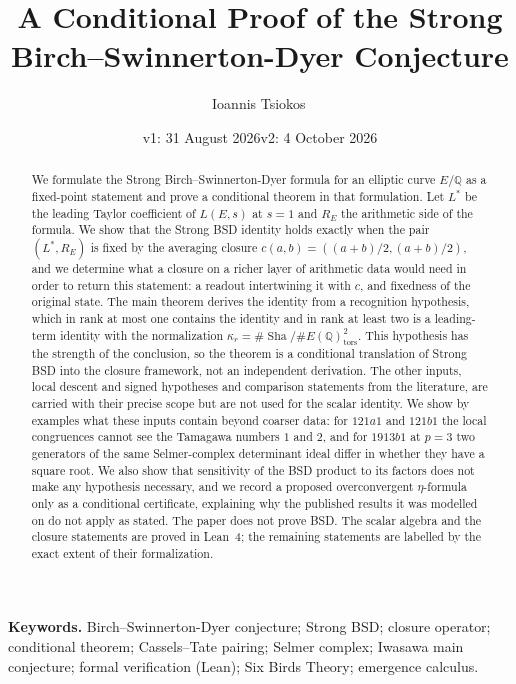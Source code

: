 \documentclass[11pt]{article}
\title{A Conditional Proof of the Strong Birch--Swinnerton-Dyer Conjecture}
\author{Ioannis Tsiokos\,\orcidlink{0009-0009-7659-5964}}
\date{v1: 31 August 2026\quad\textperiodcentered\quad v2: 4 October 2026}
\theoremstyle{definition}
\newcommand{\Q}{\mathbb{Q}}
\newcommand{\Sha}{\operatorname{Sha}}
\begin{document}
\maketitle
\thispagestyle{firstpage}

\begin{abstract}
We formulate the Strong Birch--Swinnerton-Dyer formula for an elliptic
curve $E/\Q$ as a fixed-point statement and prove a conditional theorem
in that formulation.  Let $L^*$ be the leading Taylor coefficient of
$L(E,s)$ at $s=1$ and $R_E$ the arithmetic side of the formula.  We show
that the Strong BSD identity holds exactly when the pair $(L^*,R_E)$ is
fixed by the averaging closure $c(a,b)=((a+b)/2,(a+b)/2)$, and we
determine what a closure on a richer layer of arithmetic data would need
in order to return this statement: a readout intertwining it with $c$,
and fixedness of the original state.  The main theorem derives the
identity from a recognition hypothesis, which in rank at most one
contains the identity and in rank at least two is a leading-term
identity with the normalization
$\kappa_r=\#\Sha/\#E(\Q)_{\mathrm{tors}}^2$.  This hypothesis has the
strength of the conclusion, so the theorem is a conditional translation
of Strong BSD into the closure framework, not an independent derivation.
The other inputs, local descent and signed hypotheses and comparison
statements from the literature, are carried with their precise scope
but are not used for the scalar identity.  We show by examples what these
inputs contain beyond coarser data: for $121a1$ and $121b1$ the local
congruences cannot see the Tamagawa numbers $1$ and $2$, and for $1913b1$
at $p=3$ two generators of the same Selmer-complex determinant ideal
differ in whether they have a square root.  We also show that sensitivity
of the BSD product to its factors does not make any hypothesis necessary,
and we record a proposed overconvergent $\eta$-formula only as a
conditional certificate, explaining why the published results it was
modelled on do not apply as stated.  The paper does not prove BSD.  The
scalar algebra and the closure statements are proved in Lean~4; the
remaining statements are labelled by the exact extent of their
formalization.
\end{abstract}

\medskip
\noindent\textbf{Keywords.} Birch--Swinnerton-Dyer conjecture; Strong BSD;
closure operator; conditional theorem; Cassels--Tate pairing; Selmer
complex; Iwasawa main conjecture; formal verification (Lean); Six Birds
Theory; emergence calculus.
\end{document}
